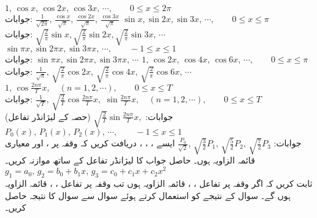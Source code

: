 \quad
$1,\, \cos x,\, \cos 2x,\, \cos 3x,\, \cdots,\quad \quad 0\le x\le 2\pi$\\
جوابات:
$\frac{1}{\sqrt{2\pi}},\, \frac{\cos x}{\sqrt{\pi}},\, \frac{\cos 2x}{\sqrt{\pi}},\, \frac{\cos 3x}{\sqrt{\pi}}$
\quad
$\sin x, \sin 2x, \sin 3x,\, \cdots,\quad \quad 0\le x\le \pi$\\
جوابات:
$\sqrt{\frac{2}{\pi}}\sin x, \sqrt{\frac{2}{\pi}}\sin 2x, \sqrt{\frac{2}{\pi}}\sin 3x,\, \cdots$
\quad
$\sin \pi x, \sin 2\pi x, \sin 3\pi x,\, \cdots,\quad \quad -1\le x\le 1$\\
جوابات:
$\sin \pi x, \sin 2\pi x, \sin 3\pi x,\, \cdots$
\quad
$1,\, \cos 2x,\, \cos 4x,\, \cos 6x,\, \cdots,\quad \quad 0\le x\le \pi$\\
جوابات:
$\frac{1}{\sqrt{\pi}},\, \sqrt{\frac{2}{\pi}}\cos 2x,\, \sqrt{\frac{2}{\pi}}\cos 4x,\, \sqrt{\frac{2}{\pi}}\cos 6x,\, \cdots$
\quad
$1,\, \cos \frac{2n\pi}{T}x, \quad (n=1,2,\cdots),\quad \quad 0\le x\le T$\\
جوابات:
$\frac{1}{\sqrt{T}},\, \sqrt{\frac{2}{T}}\cos \frac{2n\pi}{T}x, $
\quad
$\sin \frac{2n\pi}{T}x, \quad (n=1,2,\cdots),\quad \quad 0\le x\le T$\\
جوابات:
$\sqrt{\frac{2}{T}}\sin \frac{2n\pi}{T}x, $
\quad (حصہ  کے لیژانڈر تفاعل)
$P_0(x),\, P_1(x),\, P_2(x),\, \cdots,\quad \quad -1\le x\le 1$\\
جوابات:
$\frac{P_0}{\sqrt{2}},\, \sqrt{\frac{3}{2}}P_1,\,  \sqrt{\frac{5}{2}}P_2,\, \sqrt{\frac{7}{2}}P_3$
\quad ایسے ، ، ، دریافت کریں کہ  وقفہ  پر  ،  اور  معیاری قائمہ الزاویہ ہوں۔ حاصل جواب کا لیژانڈر تفاعل کے ساتھ موازنہ کریں۔ \quad 
$g_1=a_0,\, g_2=b_0+b_1x,\, g_3=c_0+c_1x+c_2x^2$\\
ثابت کریں کہ اگر وقفہ  پر تفاعل ، ،  قائمہ الزاویہ ہوں تب وقفہ  پر تفاعل ، ،  قائمہ الزاویہ ہوں گے۔
سوال  کے نتیجے کو استعمال کرتے ہوئے سوال  سے سوال  کا نتیجہ حاصل کریں۔

